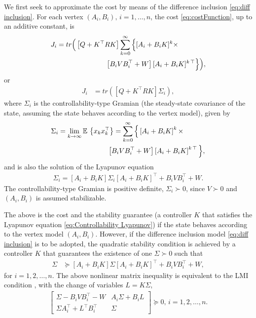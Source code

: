 \documentclass[letterpaper, 10 pt, conference]{ieeeconf}
\newcommand{\trace}{\textit{tr}}
\newcommand{\E}{\mathbb{E\,}}
\begin{document}
We first seek to approximate the cost by means of the difference inclusion \eqref{eq:diff inclusion}. For each vertex $(A_i,B_i),\,i=1,\hdots,n$, the cost \eqref{eq:costFunction}, up to an additive constant, is
\begin{align*} 
    J_i &= \trace \Big ( \left [ Q + K^\top R K \right ] \sum_{k=0}^\infty \Big \{[A_i+B_iK]^k \times \\
    &\hskip25mm \left [B_i V B_i^\top + W\right][A_i+B_iK]^{k\,\top} \Big \}\Big ),
\end{align*}
or
\begin{equation}\label{eq:cost Controllability type (i)}
\begin{aligned} 
    J_i &= \trace \left (\left [ Q + K^\top R K \right ] \Sigma_i  \right ),
\end{aligned}
\end{equation}
where $\Sigma_i $ is the controllability-type Gramian (the steady-state covariance of the state, assuming the state behaves according to the vertex model), given by
\begin{align}
    \Sigma_i  &= \lim_{k \to \infty}\E \left \{x_k x_k^\top \right \}  =\sum_{k=0}^\infty \Big \{ \left [ A_i+B_iK\right ]^k \times \nonumber
    \\ &\hskip25mm
    \left [B_i V B_i^\top + W\right] \left [ A_i+B_iK\right ]^{k\,\top} \Big \}, \label{eq:Sigma as state covariance}
\end{align}
and is also the solution of the Lyapunov equation
\begin{align}
    \Sigma_i = \left [ A_i+B_iK\right ] \Sigma_i \left [ A_i+B_iK\right ]^\top + B_iV B_i^\top + W. \label{eq:Controllability Lyapunov}
\end{align}
The controllability-type Gramian is positive definite, $\Sigma_i \succ 0$, since $V \succ 0$ and $(A_i,B_i)$ is assumed stabilizable.

The above is the cost and the stability guarantee (a controller $K$ that satisfies the Lyapunov equation \eqref{eq:Controllability Lyapunov}) if the state behaves according to the vertex model $(A_i, B_i)$. However, if the difference inclusion model \eqref{eq:diff inclusion} is to be adopted, the quadratic stability condition is achieved by a controller $K$ that guarantees the existence of one $\Sigma \succ 0$ such that
\begin{align*}
    \Sigma &\succeq \left [ A_i+B_iK\right ] \Sigma \left [ A_i+B_iK\right ]^\top + B_iV B_i^\top + W,
\end{align*}
for $i=1,2,\hdots,n.$ The above nonlinear matrix inequality is equivalent to the LMI condition \cite{boyd1993control}, with the change of variables $L = K \Sigma$,
\begin{align*}
    \begin{bmatrix}
        \Sigma-B_i V B_i^\top-W & A_i \Sigma + B_i L \\
        \Sigma A_i^\top + L^\top B_i^\top & \Sigma
    \end{bmatrix} \succeq 0, \,i=1,2,\hdots,n.
\end{align*}
\end{document}
